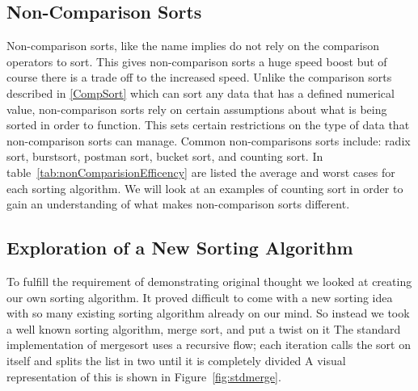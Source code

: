 \documentclass[12pt]{article}
\begin{document}
	
	
	
	
	\subsection{Non-Comparison Sorts}
	
	Non-comparison sorts, like the name implies do not rely on the comparison operators to sort.
	This gives non-comparison sorts a huge speed boost but of course there is a trade off to the increased speed.
	Unlike the comparison sorts described in \ref{CompSort} which can sort any data that has a defined numerical value, non-comparison sorts rely on certain assumptions about what is being sorted in order to function.
	This sets certain restrictions on the type of data that non-comparison sorts can manage.
	Common non-comparisons sorts include: radix sort, burstsort, postman sort, bucket sort, and counting sort.
	In table~\ref{tab:nonComparisionEfficency} are listed the average and worst cases for each sorting algorithm.
	We will look at an examples of counting sort  in order to gain an understanding of what makes non-comparison sorts different.

	
	\subsection{Exploration of a New Sorting Algorithm}
	
	To fulfill the requirement of demonstrating original thought we looked at creating our own sorting algorithm.
	It proved difficult to come with a new sorting idea with so many existing sorting algorithm already on our mind.
	So instead we took a well known sorting algorithm, merge sort, and put a twist on it
	The standard implementation of mergesort uses a recursive flow; each iteration calls the sort on itself and splits the list in two until it is completely divided
	A visual representation of this is shown in Figure~\ref{fig:stdmerge}.
	
\end{document}
